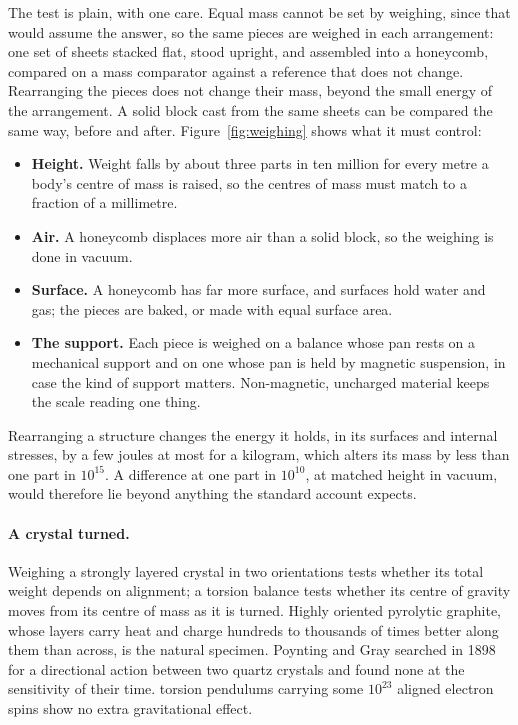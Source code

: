  The test is plain, with one care. Equal mass cannot be set by weighing, since that would assume the answer, so the same pieces are weighed in each arrangement: one set of sheets stacked flat, stood upright, and assembled into a honeycomb, compared on a mass comparator against a reference that does not change. Rearranging the pieces does not change their mass, beyond the small energy of the arrangement. A solid block cast from the same sheets can be compared the same way, before and after. Figure~\ref{fig:weighing} shows what it must control:
\begin{itemize}
\item \textbf{Height.} Weight falls by about three parts in ten million for every metre a body's centre of mass is raised, so the centres of mass must match to a fraction of a millimetre.
\item \textbf{Air.} A honeycomb displaces more air than a solid block, so the weighing is done in vacuum.
\item \textbf{Surface.} A honeycomb has far more surface, and surfaces hold water and gas; the pieces are baked, or made with equal surface area.
\item \textbf{The support.} Each piece is weighed on a balance whose pan rests on a mechanical support and on one whose pan is held by magnetic suspension, in case the kind of support matters. Non-magnetic, uncharged material keeps the scale reading one thing.
\end{itemize}
 Rearranging a structure changes the energy it holds, in its surfaces and internal stresses, by a few joules at most for a kilogram, which alters its mass by less than one part in $10^{15}$. A difference at one part in $10^{10}$, at matched height in vacuum, would therefore lie beyond anything the standard account expects.

\paragraph{A crystal turned.} Weighing a strongly layered crystal in two orientations tests whether its total weight depends on alignment; a torsion balance tests whether its centre of gravity moves from its centre of mass as it is turned. Highly oriented pyrolytic graphite, whose layers carry heat and charge hundreds to thousands of times better along them than across, is the natural specimen. Poynting and Gray searched in 1898 for a directional action between two quartz crystals and found none at the sensitivity of their time.  torsion pendulums carrying some $10^{23}$ aligned electron spins show no extra gravitational effect.

